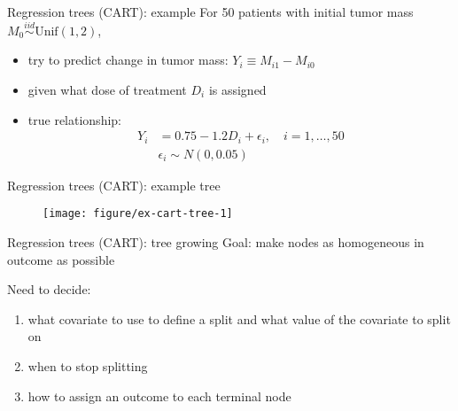 \documentclass[handout]{beamer}
\begin{document}
\begin{frame}{Regression trees (CART): example}
  For 50 patients with initial tumor mass $M_{0} \overset{iid}{\sim} \text{Unif}(1, 2)$,
  \begin{itemize}[<+->]
    \item try to predict change in tumor mass: $Y_{i} \equiv M_{i1} - M_{i0}$
    \item given what dose of treatment $D_{i}$ is assigned
    \item true relationship:
    \begin{align*}
      Y_{i} &= 0.75 - 1.2 D_{i} + \epsilon_{i}, \quad i = 1, \ldots, 50 \\
      & \epsilon_{i} \sim N(0, 0.05)
    \end{align*}
     
  \end{itemize}
  
\end{frame}

\begin{frame}[c]{Regression trees (CART): example tree}
  \begin{figure}[!htbp]
  \begin{center}
    \texttt{[image: figure/ex-cart-tree-1]}
  \end{center}
  \end{figure}
\end{frame}

\begin{frame}{Regression trees (CART): tree growing}
  Goal: make nodes as homogeneous in outcome as possible
  
  \pause
  Need to decide:
  \begin{enumerate}[<+->]
    \item what covariate to use to define a split and what value of the covariate to split on
    \item when to stop splitting
    \item how to assign an outcome to each terminal node
  \end{enumerate}
\end{frame}
\end{document}
